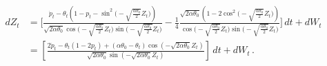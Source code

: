 \documentclass[11pt]{article}
\theoremstyle{definition}
\begin{document}
\begin{align}
dZ_t & = \Bigg[ \frac{ \dot{p}_t  - \theta_t  \left(1 - p_t - \sin^2 \Big(- \sqrt{ \frac{ \alpha \theta_0}{2} } Z_t \Big) \right) }{\sqrt{2 \alpha \theta_0} \cos\Big(- \sqrt{ \frac{ \alpha \theta_0}{2} } Z_t \Big)  \sin\Big(- \sqrt{ \frac{ \alpha \theta_0}{2} } Z_t \Big)}   - \frac{1}{4}  \frac{\sqrt{2 \alpha \theta_0} \left(1 - 2 \cos^2 \Big(- \sqrt{ \frac{ \alpha \theta_0}{2} } Z_t \Big) \right) }{\cos\Big(- \sqrt{ \frac{ \alpha \theta_0}{2} } Z_t \Big)  \sin\Big(- \sqrt{ \frac{ \alpha \theta_0}{2} } Z_t \Big)} \Bigg] \,dt + dW_t \nonumber \\
&  = \left[  \frac{  2  \dot{p}_t - \theta_t (1 - 2 p_t)  + (\alpha \theta_0 - \theta_t) \cos(- \sqrt{2 \alpha \theta_0 } Z_t) }{\sqrt{2 \alpha \theta_0} \sin{(- \sqrt{2 \alpha \theta_0} Z_t)}}  \right] \,dt + dW_t \,.  \label{eq:stindepSDE2}
\end{align}
\end{document}
